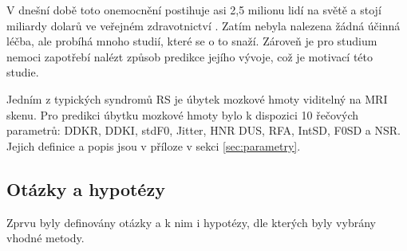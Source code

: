 \documentclass[11pt,a4paper]{article}
\begin{document}
            V dnešní době toto onemocnění postihuje asi 2,5 milionu lidí na světě a stojí miliardy dolarů ve veřejném zdravotnictví \cite{mcalpine2005}. Zatím nebyla nalezena žádná účinná léčba, ale probíhá mnoho studií, které se o to snaží. Zároveň je pro studium nemoci zapotřebí nalézt způsob predikce jejího vývoje, což je motivací této studie.
 
            Jedním z typických syndromů RS je úbytek mozkové hmoty viditelný na MRI skenu. Pro predikci úbytku mozkové hmoty bylo k dispozici 10 řečových parametrů: DDKR, DDKI, stdF0, Jitter, HNR DUS, RFA, IntSD, F0SD a NSR. Jejich definice a popis jsou v příloze v sekci \ref{sec:parametry}.
            
            \subsection{Otázky a hypotézy}
                Zprvu byly definovány otázky a k nim i hypotézy, dle kterých byly vybrány vhodné metody.
\end{document}
